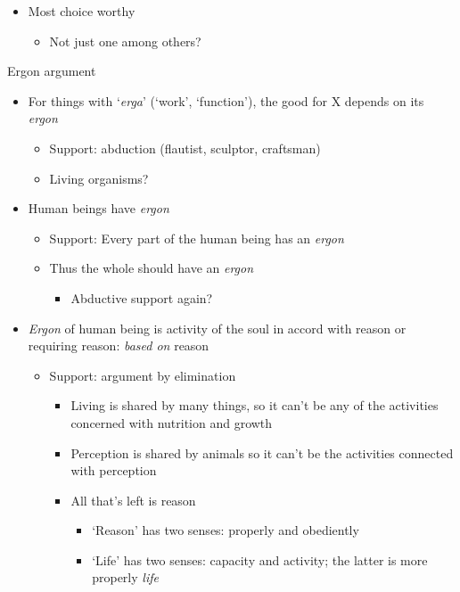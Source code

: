 \documentclass[11pt]{article}
\begin{document}
\begin{itemize}
\begin{itemize}
\item{Most choice worthy}\begin{itemize}\item{Not just one among others?}\end{itemize}

\end{itemize}

\end{itemize}

\noindent Ergon argument

\begin{itemize}\item{For things with `\emph{erga}' (`work', `function'), the good for X depends on its \emph{ergon}}\begin{itemize}\item{Support: abduction (flautist, sculptor, craftsman)}\item{Living organisms?}\end{itemize}

\item{Human beings have \emph{ergon}}\begin{itemize}\item{Support: Every part of the human being has an \emph{ergon}}\item{Thus the whole should have an \emph{ergon}}\begin{itemize}\item{Abductive support again?}\end{itemize}\end{itemize}

\item{\emph{Ergon} of human being is activity of the soul in accord with reason or requiring reason: \emph{based on} reason}\begin{itemize}\item{Support: argument by elimination}\begin{itemize}\item{Living is shared by many things, so it can't be any of the activities concerned with nutrition and growth}\item{Perception is shared by animals so it can't be the activities connected with perception}\item{All that's left is reason}\begin{itemize}\item{`Reason' has two senses: properly and obediently}\item{`Life' has two senses: capacity and activity; the latter is more properly \emph{life}}\end{itemize}\end{itemize}
\end{itemize}


\end{itemize}
\end{document}
